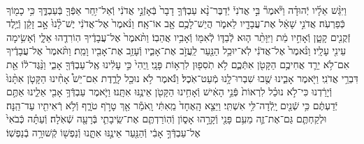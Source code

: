 \documentclass[twoside, openany, parskip=half, 11pt]{book}
\begin{document}
\begin{footnotesize}
\begin{multicols}{2}
\\
וַיִּגַּ֨שׁ אֵלָ֜יו יְֿהוּדָ֗ה וַיֹּ֘אמֶר֘ בִּ֣י אֲדֹנִי֒ יְֿדַבֶּר־נָ֨א עַבְדְּֿךָ֤ דָבָר֙ בְּֿאָזְֿנֵ֣י אֲדֹנִ֔י וְֿאַל־יִ֥חַר אַפְּֿךָ֖ בְּֿעַבְדֶּ֑ךָ כִּ֥י כָמ֖וֹךָ כְּֿפַרְעֹֽה׃ אֲדֹנִ֣י שָׁאַ֔ל אֶת־עֲבָדָ֖יו לֵאמֹ֑ר הֲיֵשׁ־לָכֶ֥ם אָ֖ב אוֹ־אָֽח׃ וַנֹּ֨אמֶר֙ אֶל־אֲדֹנִ֔י יֶשׁ־לָ֨נוּ֙ אָ֣ב זָקֵ֔ן וְֿיֶ֥לֶד זְֿקֻנִ֖ים קָטָ֑ן וְֿאָחִ֣יו מֵ֔ת וַיִּוָּתֵ֨ר ה֧וּא לְֿבַדּ֛וֹ לְֿאִמּ֖וֹ וְֿאָבִ֥יו אֲהֵבֽוֹ׃  וַתֹּ֨אמֶר֙ אֶל־עֲבָדֶ֔יךָ הֽוֹרִדֻ֖הוּ אֵלָ֑י וְֿאָשִׂ֥ימָה עֵינִ֖י עָלָֽיו׃ וַנֹּ֨אמֶר֙ אֶל־אֲדֹנִ֔י לֹֽא־יוּכַ֥ל הַנַּ֖עַר לַֽעֲזֹ֣ב אֶת־אָבִ֑יו וְֿעָזַ֥ב אֶת־אָבִ֖יו וָמֵֽת׃ וַתֹּ֨אמֶר֙ אֶל־עֲבָדֶ֔יךָ אִם־לֹ֥א יֵרֵ֛ד אֲחִיכֶ֥ם הַקָּטֹ֖ן אִתְּֿכֶ֑ם לֹ֥א תֹֽסִפ֖וּן לִרְא֥וֹת פָּנָֽי׃ וַֽיְהִי֙ כִּ֣י עָלִ֔ינוּ אֶֽל־עַבְדְּֿךָ֖ אָבִ֑י וַנַּ֨גֶּד־ל֔וֹ אֵ֖ת דִּבְרֵ֥י אֲדֹנִֽי׃  וַיֹּ֖אמֶר אָבִ֑ינוּ שֻׁ֖בוּ שִׁבְרוּ־לָ֥נוּ מְֿעַט־אֹֽכֶל׃ וַנֹּ֕אמֶר לֹ֥א נוּכַ֖ל לָרֶ֑דֶת אִם־יֵשׁ֩ אָחִ֨ינוּ הַקָּטֹ֤ן אִתָּ֨נוּ֙ וְֿיָרַ֔דְנוּ כִּי־לֹ֣א נוּכַ֗ל לִרְאוֹת֙ פְּֿנֵ֣י הָאִ֔ישׁ וְֿאָחִ֥ינוּ הַקָּטֹ֖ן אֵינֶ֥נּוּ אִתָּֽנוּ׃ וַיֹּ֛אמֶר עַבְדְּֿךָ֥ אָבִ֖י אֵלֵ֑ינוּ אַתֶּ֣ם יְֿדַעְתֶּ֔ם כִּ֥י שְֿׁנַ֖יִם יָֽלְֿדָה־לִּ֥י אִשְׁתִּֽי׃ וַיֵּצֵ֤א הָֽאֶחָד֙ מֵֽאִתִּ֔י וָֽאֹמַ֕ר אַ֖ךְ טָרֹ֣ף טֹרָ֑ף וְֿלֹ֥א רְֿאִיתִ֖יו עַד־הֵֽנָּה׃ וּלְקַחְתֶּ֧ם גַּם־אֶת־זֶ֛ה מֵעִ֥ם פָּנַ֖י וְֿקָרָ֣הוּ אָס֑וֹן וְֿהֽוֹרַדְתֶּ֧ם אֶת־שֵֽׂיבָתִ֛י בְּֿרָעָ֖ה שְֿׁאֹֽלָה׃ וְֿעַתָּ֗ה כְּֿבֹאִי֙ אֶל־עַבְדְּֿךָ֣ אָבִ֔י וְֿהַנַּ֖עַר אֵינֶ֣נּוּ אִתָּ֑נוּ וְֿנַפְשׁ֖וֹ קְֿשׁוּרָ֥ה בְֿנַפְשֽׁוֹ׃


\end{multicols}
\end{footnotesize}
\end{document}

